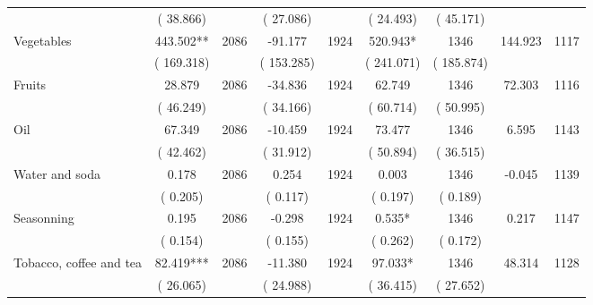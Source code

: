 \begin{tabular}{l*{8}{c}}
                       &       (      38.866)            &                               &       (      27.086)            &                               &       (      24.493)            &       (      45.171) &                  \\
Vegetables        &            443.502**      &       2086       &            -91.177      &       1924       &            520.943*      &       1346  &      144.923 &       1117       \\
                       &       (     169.318)            &                               &       (     153.285)            &                               &       (     241.071)            &       (     185.874) &                  \\
Fruits        &             28.879      &       2086       &            -34.836      &       1924       &             62.749      &       1346  &       72.303 &       1116       \\
                       &       (      46.249)            &                               &       (      34.166)            &                               &       (      60.714)            &       (      50.995) &                  \\
Oil        &             67.349      &       2086       &            -10.459      &       1924       &             73.477      &       1346  &        6.595 &       1143       \\
                       &       (      42.462)            &                               &       (      31.912)            &                               &       (      50.894)            &       (      36.515) &                  \\
Water and soda        &              0.178      &       2086       &              0.254      &       1924       &              0.003      &       1346  &       -0.045 &       1139       \\
                       &       (       0.205)            &                               &       (       0.117)            &                               &       (       0.197)            &       (       0.189) &                  \\
Seasonning        &              0.195      &       2086       &             -0.298      &       1924       &              0.535*      &       1346  &        0.217 &       1147       \\
                       &       (       0.154)            &                               &       (       0.155)            &                               &       (       0.262)            &       (       0.172) &                  \\
Tobacco, coffee and tea        &             82.419***      &       2086       &            -11.380      &       1924       &             97.033*      &       1346  &       48.314 &       1128       \\
                       &       (      26.065)            &                               &       (      24.988)            &                               &       (      36.415)            &       (      27.652) &                  \\
\hline \end{tabular}